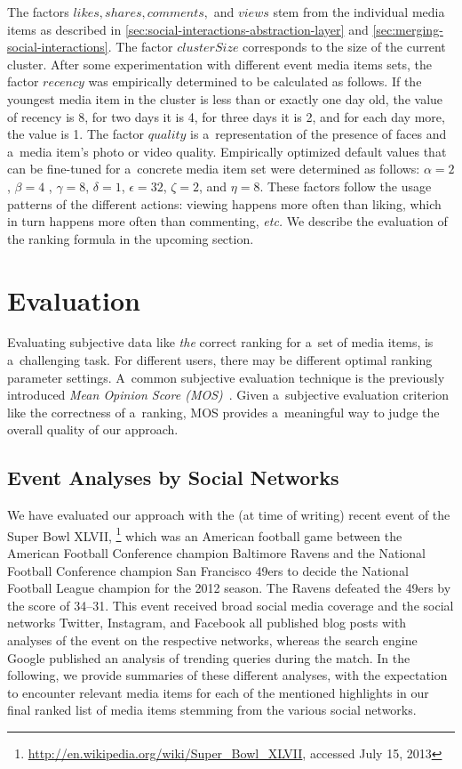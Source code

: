 The factors $ \mathit{likes}, \mathit{shares}, \mathit{comments},$ and $ \mathit{views} $
stem from the individual media items as described in \autoref{sec:social-interactions-abstraction-layer}
and \autoref{sec:merging-social-interactions}.
The factor $ \mathit{clusterSize} $ corresponds to the size of the current cluster.
After some experimentation with different event media items sets,
the factor $ \mathit{recency} $ was empirically determined to be calculated as follows.
If the youngest media item in the cluster is less than or exactly one day old,
the value of recency is 8, for two days it is 4, for three days it is 2,
and for each day more, the value is 1.
The factor $ \mathit{quality} $ is a~representation of the
presence of faces and a~media item's photo or video quality.
Empirically optimized default values
that can be fine-tuned for a~concrete media item set
were determined as follows:
$ \alpha = 2 $, $ \beta = 4 $ , $ \gamma = 8 $, $ \delta = 1 $,
$ \epsilon = 32 $, $ \zeta = 2 $, and $ \eta = 8 $.
These factors follow the usage patterns of the different actions:
viewing happens more often than liking, which in turn happens more often than commenting, \emph{etc.}
We describe the evaluation of the ranking formula in the upcoming section.

\section{Evaluation}
\label{sec-chapter7-evaluation}

Evaluating subjective data like \emph{the} correct ranking
for a~set of media items, is a~challenging task.
For different users, there may be different optimal ranking parameter settings.
A~common subjective evaluation technique
is the previously introduced \emph{Mean Opinion Score (MOS)}~\cite{itu1998mos}.
Given a~subjective evaluation criterion
like the correctness of a~ranking,
MOS provides a~meaningful way to judge the overall quality of our approach.

\subsection{Event Analyses by Social Networks}

We have evaluated our approach with the (at time of writing)
recent event of the Super Bowl XLVII,%
\footnote{\url{http://en.wikipedia.org/wiki/Super_Bowl_XLVII},
accessed July 15, 2013}
which was an American football game between
the American Football Conference champion Baltimore Ravens
and the National Football Conference champion
San Francisco 49ers to decide the National Football League
champion for the 2012 season.
The Ravens defeated the 49ers by the score of 34--31.
This event received broad social media coverage
and the social networks
Twitter, Instagram, and Facebook all published blog posts
with analyses of the event on the respective networks,
whereas the search engine Google
published an analysis of trending queries during the match.
In the following, we provide summaries of these different analyses,
with the expectation to encounter relevant media items
for each of the mentioned highlights in our final ranked list of media items
stemming from the various social networks.

